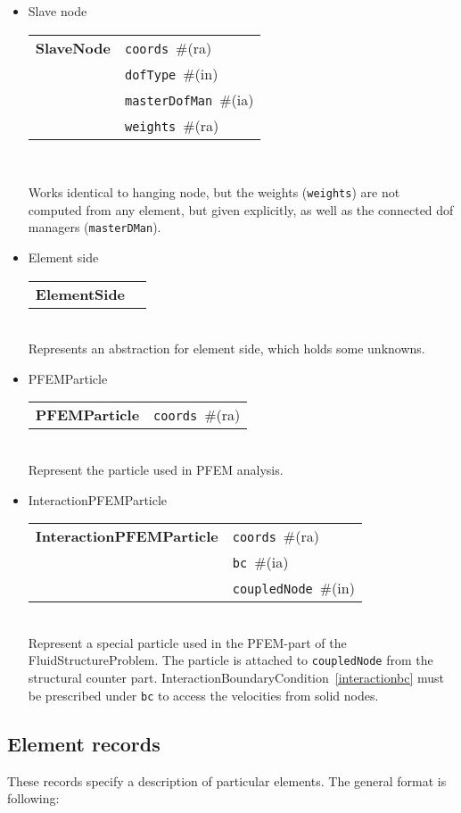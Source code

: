 \documentclass[a4paper]{article}
\makeatletter
\newcommand{\param}[1]{\texttt{#1}} %
\newcommand{\field}[2]{\param{#1}~\#{\tiny(#2)}} %
\newcommand{\entKeywordInst}[1]{\textbf{#1}} %
\newenvironment{record}[1][]{\begin{tabular}{|ll}}{\end{tabular}\\}
\newcommand{\recentry}[2]{{#1}&{#2}\\}
\newcounter{rcc}
\newenvironment{record}[1][\textwidth]{\setcounter{rcc}{0}\begin{tabular*}{#1}{|ll@{\extracolsep{\fill}}r}}{\end{tabular*}\\}
\newcommand{\recentry}[2]{\ifthenelse{\value{rcc}>0}{&$\backslash$ \\}{\setcounter{rcc}{1}}{#1}&{#2}}
\makeatother
\begin{document}
\begin{itemize}
\item Slave node

\begin{record}[0.9\textwidth]
  \recentry{\entKeywordInst{SlaveNode}}{\field{coords}{ra}}
  \recentry{}{\field{dofType}{in}}
  \recentry{}{\field{masterDofMan}{ia}}
  \recentry{}{\field{weights}{ra}}
\end{record}

Works identical to hanging node, but the weights (\param{weights}) are not computed from any element,
but given explicitly, as well as the connected dof managers (\param{masterDMan}).

\item Element side

\begin{record}[0.9\textwidth]
  \recentry{\entKeywordInst{ElementSide}}{}
\end{record}
Represents an abstraction for element side, which holds some unknowns.

\item PFEMParticle \label{pfemparticles}

\begin{record}[0.9\textwidth]
  \recentry{\entKeywordInst{PFEMParticle}}{\field{coords}{ra}}
\end{record}
Represent the particle used in PFEM analysis.

\item InteractionPFEMParticle \label{interactionparticle}

\begin{record}[0.9\textwidth]
  \recentry{\entKeywordInst{InteractionPFEMParticle}}{\field{coords}{ra}}
  \recentry{}{\field{bc}{ia}}
  \recentry{}{\field{coupledNode}{in}}
\end{record}
Represent a special particle used in the PFEM-part of the FluidStructureProblem. The particle is 
attached to \param{coupledNode} from the structural counter part. InteractionBoundaryCondition~\ref{interactionbc} must be prescribed under \param{bc} to access the velocities from solid nodes.

\end{itemize}

\subsection{Element records}
\label{_ElementsRecords}
These records specify a description of particular elements. The
general format is following:
\end{document}
